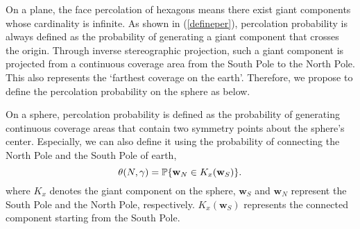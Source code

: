 \documentclass[final]{IEEEtran}
\begin{document}
 On a plane, the face percolation of hexagons means there exist giant components whose cardinality is infinite. As shown in (\ref{defineper}), percolation probability is always defined as the probability of generating a giant component that crosses the origin. Through inverse stereographic projection, such a giant 
 component is projected from a continuous coverage area from the South Pole to the North Pole. This also represents the `farthest coverage on the earth'. Therefore, we propose to define the percolation probability on the sphere as below.
\begin{definition}
    On a sphere, percolation probability is defined as the probability of generating continuous coverage areas that contain two symmetry points about the sphere's center. Especially, we can also define it using the probability of connecting the North Pole and the South Pole of earth, \ie
\begin{equation}
    \theta(N,\gamma)=\P\{\textbf{w}_N\in K_x(\textbf{w}_S)\}.
\end{equation} 
where $K_x$ denotes the giant component on the sphere, $\textbf{w}_S$ and $\textbf{w}_N$ represent the South Pole and the North Pole, respectively. $K_x(\textbf{w}_S)$ represents the connected component starting from the South Pole.
\label{def:concomsphere}
\end{definition}
\end{document}

